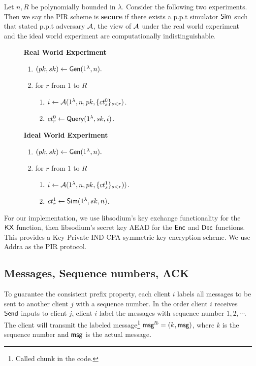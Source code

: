 \begin{definition}
\label{defn:pir-security}
Let $n, R$ be polynomially bounded in $\lambda$. Consider the following two experiments. Then we say the PIR scheme is \textbf{secure} if there exists a p.p.t simulator $\mathsf{Sim}$ such that stated p.p.t adversary $\mathcal{A}$, the view of $\mathcal{A}$ under the real world experiment and the ideal world experiment are computationally indistinguishable. 
\begin{figure}[h!]
\begin{framed}
\textbf{Real World Experiment}
\begin{enumerate}
    \item $(pk, sk) \leftarrow \mathsf{Gen}(1^{\lambda}, n).$
    \item for $r$ from $1$ to $R$
    \begin{enumerate}
        \item $i \leftarrow \mathcal{A}(1^{\lambda}, n, pk, \{ct_s^0\}_{s < r})$.
        \item $ct_r^0 \leftarrow \mathsf{Query}(1^{\lambda}, sk, i)$.
    \end{enumerate}
\end{enumerate}
\textbf{Ideal World Experiment}
\begin{enumerate}
    \item $(pk, sk) \leftarrow \mathsf{Gen}(1^{\lambda}, n).$
    \item for $r$ from $1$ to $R$
    \begin{enumerate}
        \item $i \leftarrow \mathcal{A}(1^{\lambda}, n, pk, \{ct_s^1\}_{s < r}))$.
        \item $ct_r^1 \leftarrow \mathsf{Sim}(1^{\lambda}, sk, n)$.
    \end{enumerate}
\end{enumerate}
\end{framed}
\end{figure}
\end{definition}
For our implementation, we use libsodium's key exchange functionality for the $\mathsf{KX}$ function, then libsodium's secret key AEAD for the $\mathsf{Enc}$ and $\mathsf{Dec}$ functions. This provides a Key Private IND-CPA symmetric key encryption scheme. We use Addra as the PIR protocol.
\subsection{Messages, Sequence numbers, ACK}
To guarantee the consistent prefix property, each client $i$ labels all messages to be sent to another client $j$ with a sequence number. In the order client $i$ receives $\mathsf{Send}$ inputs to client $j$, client $i$ label the messages with sequence number $1,2,\cdots$. The client will transmit the labeled message\footnote{Called chunk in the code.} $\mathsf{msg}^{lb} = (k, \mathsf{msg})$, where $k$ is the sequence number and $\mathsf{msg}$ is the actual message. 

